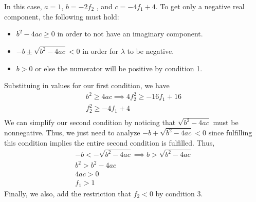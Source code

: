\begin{enumerate}
{    In this case, $a = 1$,  $b = -2f_2$ , and $c = -4f_1 + 4$.
    To get only a negative real component, the following must hold:
    \begin{itemize}
    \item $b^{2}-4ac \geq 0$ in order to not have an imaginary component.
    \item $-b \pm \sqrt{b^{2} - 4ac} < 0$ in order for $\lambda$ to be negative.
    \item $b > 0$ or else the numerator will be positive by condition 1.
    \end{itemize}

    Substituing in values for our first condition, we have
    \begin{align*}
    b^2 \geq 4ac \implies 4f_{2}^{2} \geq -16f_1 + 16 \\
     f_{2}^{2} \geq -4f_{1} + 4 \\
    \end{align*}
    We can simplify our second condition by noticing that $\sqrt{b^{2} - 4ac}$ must be nonnegative.
    Thus, we just need to analyze $-b + \sqrt{b^{2} - 4ac} < 0$ since fulfilling this condition implies the entire second condition is fulfilled.
    Thus,
    \begin{align*}
    -b < -\sqrt{b^{2} - 4ac} \implies b > \sqrt{b^{2} - 4ac}\\
    b^{2} > b^{2} - 4ac \\
    4ac > 0 \\
    f_1 > 1
    \end{align*}
    Finally, we also, add the restriction that $f_2 < 0$ by condition 3.


}
\end{enumerate}
